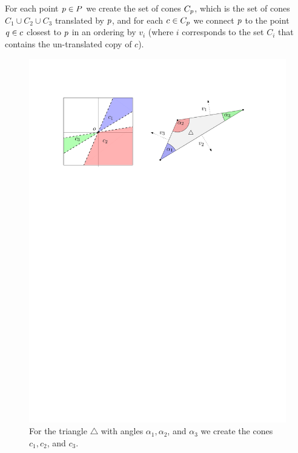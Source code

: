 \documentclass[12pt]{article}%
\begin{document}
For each point $p\in P$ we create the set of cones $C_p$, which is the set of cones $C_1\cup C_2\cup C_3$ translated by $p$, and for each $c\in C_p$ we connect $p$ to the point $q\in c$ closest to $p$ in an ordering by $v_i$ (where $i$ corresponds to the set $C_i$ that contains the un-translated copy of $c$).
  
%
%


\begin{figure}[h]
	\centering
	\includegraphics{figs/triangle_cones}
	\caption{For the triangle $\triangle$ with angles $\alpha_1,\alpha_2$, and $\alpha_3$ we create the cones $c_1,c_2$, and $c_3$.}
\end{figure}
\end{document}
